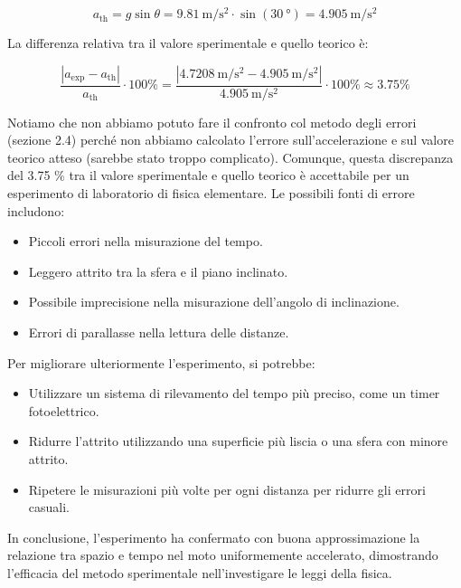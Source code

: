 \documentclass[12pt,a4paper,oneside]{book}
\theoremstyle{esercizio}
\begin{document}
\begin{equation}
    a_{\text{th}} = g\sin\theta = \SI{9.81}{\metre\per\second\squared} \cdot \sin(\SI{30}{\degree}) = \SI{4.905}{\metre\per\second\squared}
\end{equation}

La differenza relativa tra il valore sperimentale e quello teorico è:

\begin{equation}
    \frac{|a_{\text{exp}} - a_{\text{th}}|}{a_{\text{th}}} \cdot 100\% = \frac{|\SI{4.7208}{\metre\per\second\squared} - \SI{4.905}{\metre\per\second\squared}|}{\SI{4.905}{\metre\per\second\squared}} \cdot 100\% \approx 3.75\%
\end{equation}

Notiamo che non abbiamo potuto fare il confronto col metodo degli errori (sezione 2.4) perché non abbiamo calcolato l'errore sull'accelerazione e sul valore teorico atteso (sarebbe stato troppo complicato). Comunque, questa discrepanza del 3.75 \% tra il valore sperimentale e quello teorico è accettabile per un esperimento di laboratorio di fisica elementare. Le possibili fonti di errore includono:

\begin{itemize}
    \item Piccoli errori nella misurazione del tempo.
    \item Leggero attrito tra la sfera e il piano inclinato.
    \item Possibile imprecisione nella misurazione dell'angolo di inclinazione.
    \item Errori di parallasse nella lettura delle distanze.
\end{itemize}

Per migliorare ulteriormente l'esperimento, si potrebbe:
\begin{itemize}
    \item Utilizzare un sistema di rilevamento del tempo più preciso, come un timer fotoelettrico.
    \item Ridurre l'attrito utilizzando una superficie più liscia o una sfera con minore attrito.
    \item Ripetere le misurazioni più volte per ogni distanza per ridurre gli errori casuali.
\end{itemize}

In conclusione, l'esperimento ha confermato con buona approssimazione la relazione tra spazio e tempo nel moto uniformemente accelerato, dimostrando l'efficacia del metodo sperimentale nell'investigare le leggi della fisica.
\end{document}
